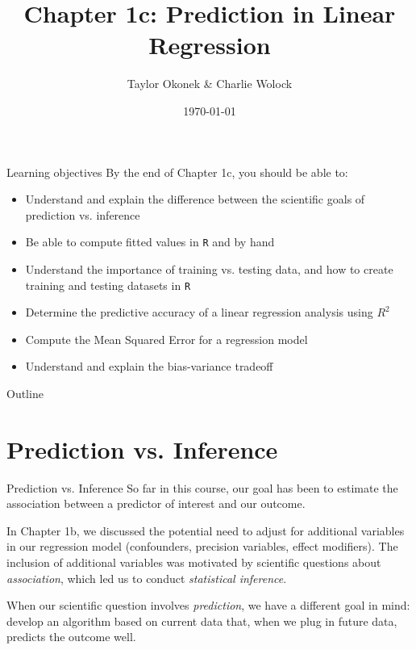 \documentclass[10pt,t]{beamer}
\title{Chapter 1c: Prediction in Linear Regression}
\author{Taylor Okonek \& Charlie Wolock}
\date{\today}
\begin{document}
	\begin{frame}
	\titlepage 
\end{frame}

\begin{frame}{Learning objectives}
By the end of Chapter 1c, you should be able to:
\begin{itemize}
	\item Understand and explain the difference between the scientific goals of prediction vs. inference
	\item Be able to compute fitted values in \texttt{R} and by hand
	\item Understand the importance of training vs. testing data, and how to create training and testing datasets in \texttt{R}
	\item Determine the predictive accuracy of a linear regression analysis using $R^2$
	\item Compute the Mean Squared Error for a regression model
	\item Understand and explain the bias-variance tradeoff
\end{itemize}
\end{frame}

\begin{frame}{Outline}
\tableofcontents
\end{frame}




\section{Prediction vs. Inference}

\begin{frame}{Prediction vs. Inference}
So far in this course, our goal has been to estimate the association between a predictor of interest and our outcome.

\vspace{0.3cm}

In Chapter 1b, we discussed the potential need to adjust for additional variables in our regression model (confounders, precision variables, effect modifiers). The inclusion of additional variables was motivated by scientific questions about \textit{association}, which led us to conduct \textit{statistical inference}.

\vspace{0.3cm}

When our scientific question involves \textit{prediction}, we have a different goal in mind: develop an algorithm based on current data that, when we plug in future data, predicts the outcome well.
\end{frame}
\end{document}
